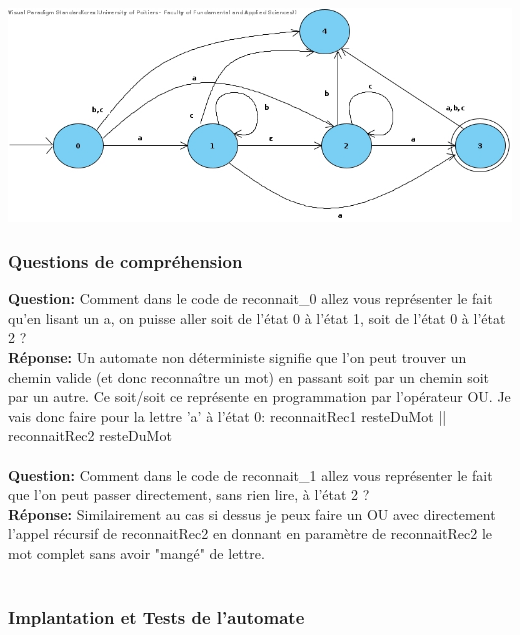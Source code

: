 \documentclass[./standalone.tex]{subfiles}
\begin{document}
\begin{center}
	\includegraphics[scale=0.5]{../VP/ex3.jpg}
\end{center}

\subsubsection{Questions de compréhension}
\medskip

\textbf{Question:} Comment dans le code de reconnait\_0 allez vous représenter le fait qu'en lisant un a, on puisse aller soit de l'état 0 à l'état 1, soit de l'état 0 à l'état 2 ?\\

\textbf{Réponse:} Un automate non déterministe signifie que l'on peut trouver un chemin valide (et donc reconnaître un mot) en passant soit par un chemin soit par un autre. Ce soit/soit ce représente en programmation par l'opérateur OU. Je vais donc faire pour la lettre 'a' à l'état 0: reconnaitRec1 resteDuMot || reconnaitRec2 resteDuMot\\\\


\textbf{Question:} Comment dans le code de reconnait\_1 allez vous représenter le fait que l'on peut passer directement, sans rien lire, à l'état 2 ?\\

\textbf{Réponse:} Similairement au cas si dessus je peux faire un OU avec directement l'appel récursif de reconnaitRec2 en donnant en paramètre de reconnaitRec2 le mot complet sans avoir "mangé" de lettre.\\\\
\newpage


\subsubsection{Implantation et Tests de l'automate}

\newpage
\end{document}
